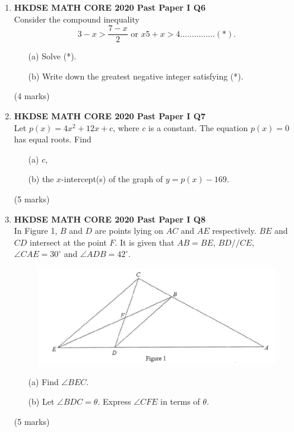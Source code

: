 \documentclass[12pt]{article}
\begin{document}
\begin{enumerate}
	\item \textbf{HKDSE MATH CORE 2020 Past Paper I Q6}\\
	Consider the compound inequality $$3 - x > \dfrac{7 - x}{2} \text{ or } x 5 + x > 4 \dots\dots\dots\dots\dots (*) .$$
	\begin{enumerate}
		\item[(a)] Solve (*).
		\item[(b)] Write down the greatest negative integer satisfying (*). 
	\end{enumerate}
	(4 marks)

	\item \textbf{HKDSE MATH CORE 2020 Past Paper I Q7}\\
	Let $p(x) = 4x^2 + 12x + c$, where $c$ is a constant. The equation $p(x)=0$ has equal roots. Find
	\begin{enumerate}
		\item[(a)] $c$,
		\item[(b)] the $x$-intercept(s) of the graph of $y = p(x) - 169$.
	\end{enumerate}
	(5 marks)
	
	\item \textbf{HKDSE MATH CORE 2020 Past Paper I Q8}\\
	In Figure 1, $B$ and $D$ are points lying on $AC$ and $AE$ respectively. $BE$ and $CD$ intersect at the point $F$. It is given that $AB = BE$, $BD // CE$, $\angle CAE=30^\circ$ and $\angle ADB=42^\circ$.
	\begin{figure}[H]
		\centering
		\includegraphics[width = .3\linewidth]{2020Figure1.1}
	\end{figure}
	\begin{enumerate}
		\item[(a)] Find $\angle BEC$.
		\item[(b)] Let $\angle BDC = \theta$. Express $\angle CFE$ in terms of $\theta$.
	\end{enumerate}
	(5 marks)	
	

\end{enumerate}
\end{document}

